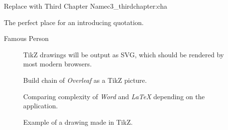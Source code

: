 
\begin{chapterpage}{Replace with Third Chapter Name}{c3_thirdchapter:cha}

\begin{myquotation} The perfect place for an introducing quotation.\par\vspace*{15mm}
\mbox{}\hfill \emdash{}Famous Person
\par\end{myquotation}

\end{chapterpage}



\begin{figure}
\centering
{}
\caption{TikZ drawings will be output as SVG, which should be rendered by most modern browsers.}
\end{figure}


\begin{figure}
\centering

\caption{Build chain of \textit{Overleaf} as a TikZ picture.}
\end{figure}

\begin{figure}
\centering

\caption{Comparing complexity of \textit{Word} and \textit{LaTeX} depending on the application.}
\end{figure}

\begin{figure}
\centering

\caption{Example of a drawing made in TikZ.}
\end{figure}


